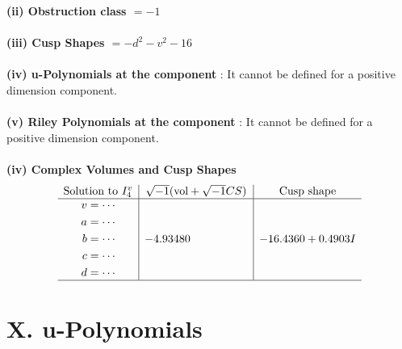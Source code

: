\documentclass[1p]{elsarticle_modified}
\theoremstyle{definition}
\newcommand{\I}{\sqrt{-1}}
\begin{document}
\flushleft \textbf{(ii) Obstruction class $= -1$}\\~\\
\flushleft \textbf{(iii) Cusp Shapes $= - d^2- v^2-16$}\\~\\
\flushleft \textbf{(iv) u-Polynomials at the component} : It cannot be defined for a positive dimension component.\\~\\
\flushleft \textbf{(v) Riley Polynomials at the component} : It cannot be defined for a positive dimension component.\\~\\
\newpage\flushleft \textbf{(iv) Complex Volumes and Cusp Shapes}
$$\begin{array}{c|c|c} 
\text{Solution to }I^v_{4}& \I (\text{vol} + \sqrt{-1}CS) & \text{Cusp shape}\\
 \hline 
\begin{aligned}
v &= \cdots \\
a &= \cdots \\
b &= \cdots \\
c &= \cdots \\
d &= \cdots\end{aligned}
 & -4.93480\phantom{ +0.000000I} & -16.4360 + 0.4903 I\\
 \hline 
 \end{array}
$$
\newpage\renewcommand{\arraystretch}{1}
\centering \section*{ X. u-Polynomials}
\end{document}
